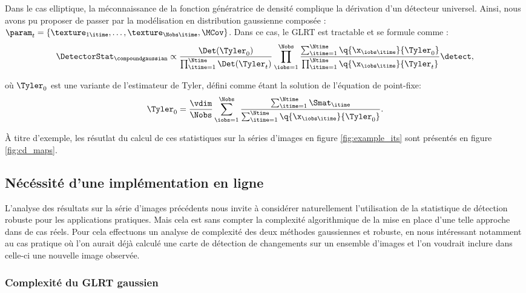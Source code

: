 Dans le cas elliptique, la méconnaissance de la fonction génératrice de densité complique la dérivation d'un détecteur universel. Ainsi, nous avons pu proposer de passer par la modélisation en distribution gaussienne composée : $\param_t = \{\texture_{1\itime},\dots,\texture_{\Nobs\itime}, \MCov\}$. Dans ce cas, le GLRT est tractable et se formule comme \cite{Mian_2019}:
\begin{equation}
  \DetectorStat_\compoundgaussian \propto \dfrac{\Det(\Tyler_0)}{\prod_{\itime=1}^{\Ntime} \Det(\Tyler_t)} \prod_{\iobs=1}^{\Nobs} \dfrac{\sum_{\itime=1}^{\Ntime}\q{\x_{\iobs\itime}}{\Tyler_0}}{\prod_{\itime=1}^{\Ntime}\q{\x_{\iobs\itime}}{\Tyler_t}} \detect,
  \label{eq:glrt_nongaussian_cd}
\end{equation}

où $\Tyler_0$ est une variante de l'estimateur de Tyler, défini comme étant la solution de l'équation de point-fixe:
\begin{equation}
  \Tyler_0 = \frac{\vdim}{\Nobs} \sum_{\iobs=1}^{\Nobs} \dfrac{\sum_{\itime=1}^{\Ntime} \Smat_\itime}{\sum_{\itime=1}^{\Ntime} \q{\x_{\iobs\itime}}{\Tyler_0}}.
\end{equation}


À titre d'exemple, les résutlat du calcul de ces statistiques sur la séries d'images en figure \ref{fig:example_its} sont présentés en figure \ref{fig:cd_maps}.


\subsection{Nécéssité d'une implémentation en ligne}

L'analyse des résultats sur la série d'images précédents nous invite à considérer naturellement l'utilisation de la statistique de détection robuste pour les applications pratiques. Mais cela est sans compter la complexité algorithmique de la mise en place d'une telle approche dans de cas réels. Pour cela effectuons un analyse de complexité des deux méthodes gaussiennes et robuste, en nous intéressant notamment au cas pratique où l'on aurait déjà calculé une carte de détection de changements sur un ensemble d'images et l'on voudrait inclure dans celle-ci une nouvelle image observée.

\subsubsection{Complexité du GLRT gaussien}


